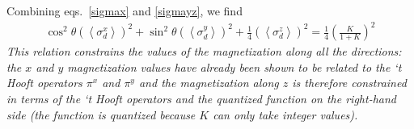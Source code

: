 \documentclass[reprint,prb,superscriptaddress]{revtex4-2}
\begin{document}
Combining eqs.~\ref{sigmax} and \ref{sigmayz}, we find
\begin{equation}\begin{aligned}
	\cos^2\theta\left(\left<\sigma^x_d\right>\right)^2 + \sin^2\theta\left(\left<\sigma^y_d\right>\right)^2 + \frac{1}{4}\left(\left<\sigma^z_d\right>\right)^2 = \frac{1}{4}\left(\frac{K}{1+K}\right)^2
\end{aligned}\end{equation}
\textit{This relation constrains the values of the magnetization along all the directions: the \(x\) and \(y\) magnetization values have already been shown to be related to the `t Hooft operators \(\pi^x\) and \(\pi^y\) and the magnetization along \(z\) is therefore constrained in terms of the `t Hooft operators and the quantized function on the right-hand side (the function is quantized because \(K\) can only take integer values).}


%
%
%
\end{document}
